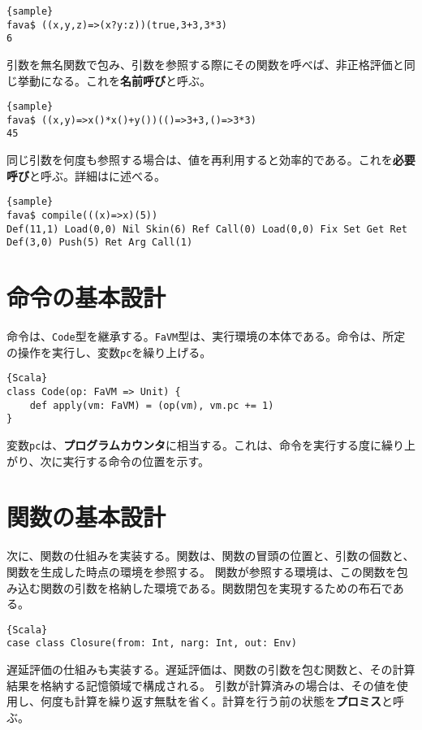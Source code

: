\documentclass[10pt,a4paper]{book}
\begin{document}
\begin{Verbatim}{sample}
fava$ ((x,y,z)=>(x?y:z))(true,3+3,3*3)
6
\end{Verbatim}

引数を無名関数で包み、引数を参照する際にその関数を呼べば、非正格評価と同じ挙動になる。これを\textbf{名前呼び}と呼ぶ。

\begin{Verbatim}{sample}
fava$ ((x,y)=>x()*x()+y())(()=>3+3,()=>3*3)
45
\end{Verbatim}

同じ引数を何度も参照する場合は、値を再利用すると効率的である。これを\textbf{必要呼び}と呼ぶ。詳細はに述べる。

\begin{Verbatim}{sample}
fava$ compile(((x)=>x)(5))
Def(11,1) Load(0,0) Nil Skin(6) Ref Call(0) Load(0,0) Fix Set Get Ret Def(3,0) Push(5) Ret Arg Call(1)
\end{Verbatim}

\section{命令の基本設計}

命令は、\texttt{Code}型を継承する。\texttt{FaVM}型は、実行環境の本体である。命令は、所定の操作を実行し、変数\texttt{pc}を繰り上げる。

\begin{Verbatim}{Scala}
class Code(op: FaVM => Unit) {
	def apply(vm: FaVM) = (op(vm), vm.pc += 1)
}
\end{Verbatim}

変数\texttt{pc}は、\textbf{プログラムカウンタ}に相当する。これは、命令を実行する度に繰り上がり、次に実行する命令の位置を示す。

\section{関数の基本設計\label{sect:func}}

次に、関数の仕組みを実装する。関数は、関数の冒頭の位置と、引数の個数と、関数を生成した時点の環境を参照する。
関数が参照する環境は、この関数を包み込む関数の引数を格納した環境である。関数閉包を実現するための布石である。

\begin{Verbatim}{Scala}
case class Closure(from: Int, narg: Int, out: Env)
\end{Verbatim}

遅延評価の仕組みも実装する。遅延評価は、関数の引数を包む関数と、その計算結果を格納する記憶領域で構成される。
引数が計算済みの場合は、その値を使用し、何度も計算を繰り返す無駄を省く。計算を行う前の状態を\textbf{プロミス}と呼ぶ。
\end{document}
